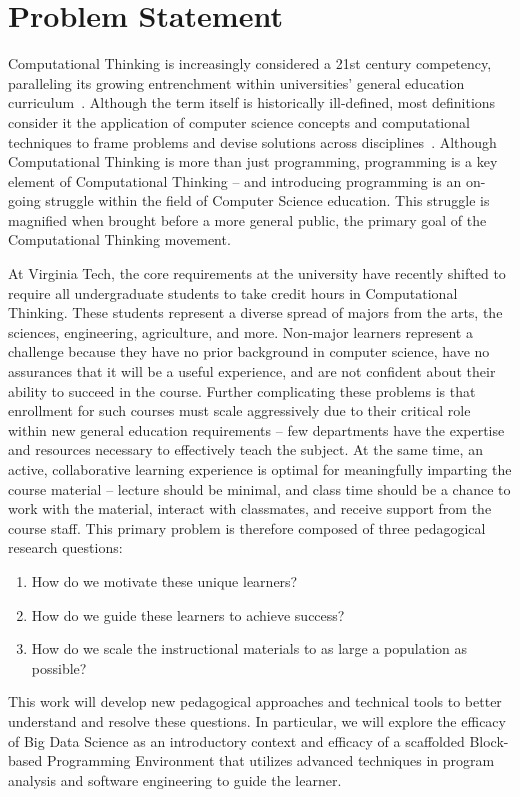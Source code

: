 \section{Problem Statement}

Computational Thinking is increasingly considered a 21st century competency, paralleling its growing entrenchment within universities’ general education curriculum~\cite{wing2006}.
Although the term itself is historically ill-defined, most definitions consider it the application of computer science concepts and computational techniques to frame problems and devise solutions across disciplines~\cite{weinberg2013}. 
Although Computational Thinking is more than just programming, programming is a key element of Computational Thinking -- and introducing programming is an on-going struggle within the field of Computer Science education.
This struggle is magnified when brought before a more general public, the primary goal of the Computational Thinking movement.

At Virginia Tech, the core requirements at the university have recently shifted to require all undergraduate students to take credit hours in Computational Thinking.
These students represent a diverse spread of majors from the arts, the sciences, engineering, agriculture, and more.
Non-major learners represent a challenge because they have no prior background in computer science, have no assurances that it will be a useful experience, and are not confident about their ability to succeed in the course.
Further complicating these problems is that enrollment for such courses must scale aggressively due to their critical role within new general education requirements -- few departments have the expertise and resources necessary to effectively teach the subject.
At the same time, an active, collaborative learning experience is optimal for meaningfully imparting the course material – lecture should be minimal, and class time should be a chance to work with the material, interact with classmates, and receive support from the course staff.
This primary problem is therefore composed of three pedagogical research questions:
\begin{enumerate}
	\item How do we motivate these unique learners?
	\item How do we guide these learners to achieve success?
	\item How do we scale the instructional materials to as large a population as possible?
\end{enumerate}

This work will develop new pedagogical approaches and technical tools to better understand and resolve these questions.
In particular, we will explore the efficacy of Big Data Science as an introductory context and efficacy of a scaffolded Block-based Programming Environment that utilizes advanced techniques in program analysis and software engineering to guide the learner.

